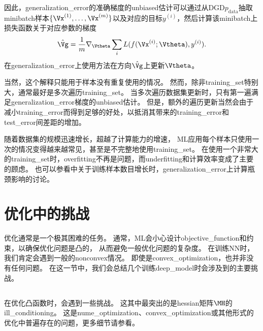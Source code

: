 因此，\gls{generalization_error}的准确梯度的\gls{unbiased}估计可以通过从\gls{DGD}$p_\text{data}$抽取\gls{minibatch}样本$\{ \Vx^{(1)}, \dots,\Vx^{(m)} \}$以及对应的目标$y^{(i)}$，然后计算该\gls{minibatch}上损失函数关于对应参数的梯度
\begin{equation}
\label{eq:8.9}
    \hat{\Vg} = \frac{1}{m} \nabla_{\Vtheta} \sum_i L(f(\Vx^{(i)};\Vtheta),y^{(i)} ).
\end{equation}
在\gls{generalization_error}上使用方法在方向$\hat{\Vg}$上更新$\Vtheta$。


当然，这个解释只能用于样本没有重复使用的情况。
然而，除非\gls{training_set}特别大，通常最好是多次遍历\gls{training_set}。
当多次遍历数据集更新时，只有第一遍满足\gls{generalization_error}梯度的\gls{unbiased}估计。
但是，额外的遍历更新当然会由于减小\gls{training_error}而得到足够的好处，以抵消其带来的\gls{training_error}和\gls{test_error}间差距的增加。


随着数据集的规模迅速增长，超越了计算能力的增速，
\gls{ML}应用每个样本只使用一次的情况变得越来越常见，甚至是不完整地使用\gls{training_set}。
在使用一个非常大的\gls{training_set}时，\gls{overfitting}不再是问题，而\gls{underfitting}和计算效率变成了主要的顾虑。
也可以参看\cite{bottou-bousquet-2008}中关于训练样本数目增长时，\gls{generalization_error}上计算瓶颈影响的讨论。


\section{优化中的挑战}
\label{sec:challenges_in_neural_network_optimization}
优化通常是一个极其困难的任务。
通常，\gls{ML}会小心设计\gls{objective_function}和约束，以确保优化问题是凸的，
从而避免一般优化问题的复杂度。
在训练\gls{NN}时，我们肯定会遇到一般的\gls{nonconvex}情况。
即使是\gls{convex_optimization}，也并非没有任何问题。
在这一节中，我们会总结几个训练\gls{deep_model}时会涉及到的主要挑战。


\subsection{}
\label{sec:ill_conditioning}
在优化凸函数时，会遇到一些挑战。
这其中最突出的是\gls{hessian}矩阵$\MH$的\gls{ill_conditioning}。
这是\gls{nume_optimization}、\gls{convex_optimization}或其他形式的优化中普遍存在的问题，更多细节请参看。

